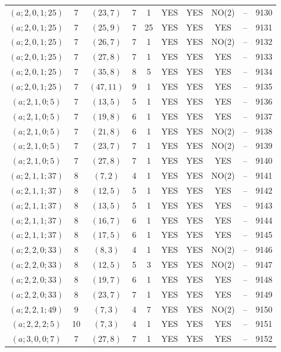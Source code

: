 \begin{longtable}{|c|c|c|c|c|c|c|c|c|c|}
$(a; 2, 0, 1; 25)$ & 7 & $(23, 7)$ & 7 & 1 & YES & YES & NO(2) & -- & 9130\\
$(a; 2, 0, 1; 25)$ & 7 & $(25, 9)$ & 7 & 25 & YES & YES & YES & -- & 9131\\
$(a; 2, 0, 1; 25)$ & 7 & $(26, 7)$ & 7 & 1 & YES & YES & NO(2) & -- & 9132\\
$(a; 2, 0, 1; 25)$ & 7 & $(27, 8)$ & 7 & 1 & YES & YES & YES & -- & 9133\\
$(a; 2, 0, 1; 25)$ & 7 & $(35, 8)$ & 8 & 5 & YES & YES & YES & -- & 9134\\
$(a; 2, 0, 1; 25)$ & 7 & $(47, 11)$ & 9 & 1 & YES & YES & YES & -- & 9135\\
$(a; 2, 1, 0; 5)$ & 7 & $(13, 5)$ & 5 & 1 & YES & YES & YES & -- & 9136\\
$(a; 2, 1, 0; 5)$ & 7 & $(19, 8)$ & 6 & 1 & YES & YES & YES & -- & 9137\\
$(a; 2, 1, 0; 5)$ & 7 & $(21, 8)$ & 6 & 1 & YES & YES & NO(2) & -- & 9138\\
$(a; 2, 1, 0; 5)$ & 7 & $(23, 7)$ & 7 & 1 & YES & YES & NO(2) & -- & 9139\\
$(a; 2, 1, 0; 5)$ & 7 & $(27, 8)$ & 7 & 1 & YES & YES & YES & -- & 9140\\
$(a; 2, 1, 1; 37)$ & 8 & $(7, 2)$ & 4 & 1 & YES & YES & NO(2) & -- & 9141\\
$(a; 2, 1, 1; 37)$ & 8 & $(12, 5)$ & 5 & 1 & YES & YES & YES & -- & 9142\\
$(a; 2, 1, 1; 37)$ & 8 & $(13, 5)$ & 5 & 1 & YES & YES & YES & -- & 9143\\
$(a; 2, 1, 1; 37)$ & 8 & $(16, 7)$ & 6 & 1 & YES & YES & YES & -- & 9144\\
$(a; 2, 1, 1; 37)$ & 8 & $(17, 5)$ & 6 & 1 & YES & YES & YES & -- & 9145\\
$(a; 2, 2, 0; 33)$ & 8 & $(8, 3)$ & 4 & 1 & YES & YES & NO(2) & -- & 9146\\
$(a; 2, 2, 0; 33)$ & 8 & $(12, 5)$ & 5 & 3 & YES & YES & NO(2) & -- & 9147\\
$(a; 2, 2, 0; 33)$ & 8 & $(19, 7)$ & 6 & 1 & YES & YES & YES & -- & 9148\\
$(a; 2, 2, 0; 33)$ & 8 & $(23, 7)$ & 7 & 1 & YES & YES & YES & -- & 9149\\
$(a; 2, 2, 1; 49)$ & 9 & $(7, 3)$ & 4 & 7 & YES & YES & NO(2) & -- & 9150\\
$(a; 2, 2, 2; 5)$ & 10 & $(7, 3)$ & 4 & 1 & YES & YES & YES & -- & 9151\\
$(a; 3, 0, 0; 7)$ & 7 & $(27, 8)$ & 7 & 1 & YES & YES & YES & -- & 9152\\

\end{longtable}
